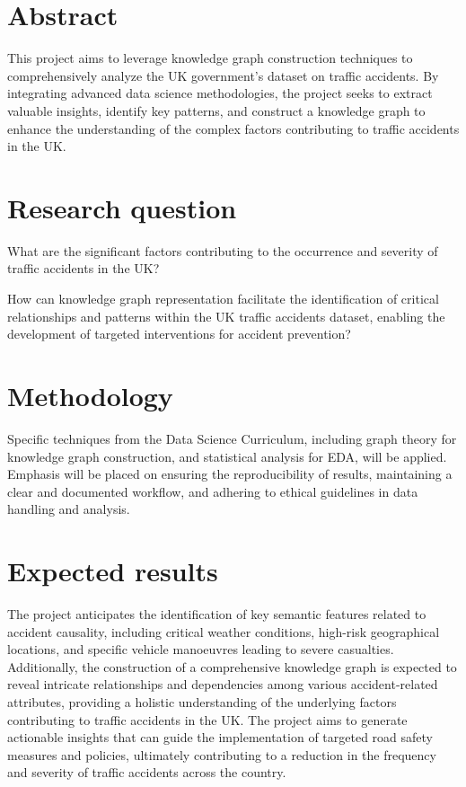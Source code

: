 \documentclass[11pt, oneside]{article}
\begin{document}


\section{Abstract}

This project aims to leverage knowledge graph construction techniques to comprehensively analyze the UK government's dataset on traffic accidents. By integrating advanced data science methodologies, the project seeks to extract valuable insights, identify key patterns, and construct a knowledge graph to enhance the understanding of the complex factors contributing to traffic accidents in the UK.

\section{Research question}

What are the significant factors contributing to the occurrence and severity of traffic accidents in the UK?

How can knowledge graph representation facilitate the identification of critical relationships and patterns within the UK traffic accidents dataset, enabling the development of targeted interventions for accident prevention?

\section{Methodology}

Specific techniques from the Data Science Curriculum, including graph theory for knowledge graph construction, and statistical analysis for EDA, will be applied. Emphasis will be placed on ensuring the reproducibility of results, maintaining a clear and documented workflow, and adhering to ethical guidelines in data handling and analysis.

\section{Expected results}

The project anticipates the identification of key semantic features related to accident causality, including critical weather conditions, high-risk geographical locations, and specific vehicle manoeuvres leading to severe casualties. Additionally, the construction of a comprehensive knowledge graph is expected to reveal intricate relationships and dependencies among various accident-related attributes, providing a holistic understanding of the underlying factors contributing to traffic accidents in the UK. The project aims to generate actionable insights that can guide the implementation of targeted road safety measures and policies, ultimately contributing to a reduction in the frequency and severity of traffic accidents across the country.
\end{document}
